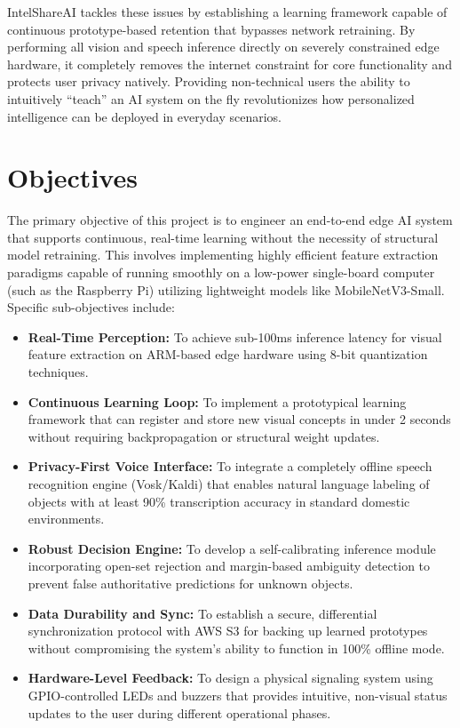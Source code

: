 \documentclass[12pt,a4paper]{report}
\begin{document}
IntelShareAI tackles these issues by establishing a learning framework capable of continuous prototype-based retention that bypasses network retraining. By performing all vision and speech inference directly on severely constrained edge hardware, it completely removes the internet constraint for core functionality and protects user privacy natively. Providing non-technical users the ability to intuitively ``teach'' an AI system on the fly revolutionizes how personalized intelligence can be deployed in everyday scenarios.

\section{Objectives}
The primary objective of this project is to engineer an end-to-end edge AI system that supports continuous, real-time learning without the necessity of structural model retraining. This involves implementing highly efficient feature extraction paradigms capable of running smoothly on a low-power single-board computer (such as the Raspberry Pi) utilizing lightweight models like MobileNetV3-Small. Specific sub-objectives include:

\begin{itemize}
    \item \textbf{Real-Time Perception:} To achieve sub-100ms inference latency for visual feature extraction on ARM-based edge hardware using 8-bit quantization techniques.
    \item \textbf{Continuous Learning Loop:} To implement a prototypical learning framework that can register and store new visual concepts in under 2 seconds without requiring backpropagation or structural weight updates.
    \item \textbf{Privacy-First Voice Interface:} To integrate a completely offline speech recognition engine (Vosk/Kaldi) that enables natural language labeling of objects with at least 90\% transcription accuracy in standard domestic environments.
    \item \textbf{Robust Decision Engine:} To develop a self-calibrating inference module incorporating open-set rejection and margin-based ambiguity detection to prevent false authoritative predictions for unknown objects.
    \item \textbf{Data Durability and Sync:} To establish a secure, differential synchronization protocol with AWS S3 for backing up learned prototypes without compromising the system's ability to function in 100\% offline mode.
    \item \textbf{Hardware-Level Feedback:} To design a physical signaling system using GPIO-controlled LEDs and buzzers that provides intuitive, non-visual status updates to the user during different operational phases.
\end{itemize}
\end{document}
